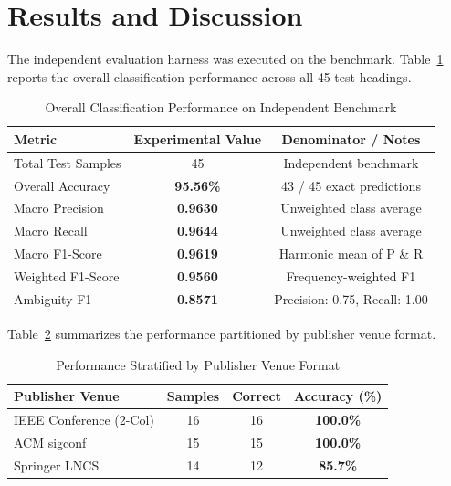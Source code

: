 \documentclass[conference]{IEEEtran}
\begin{document}
\section{Results and Discussion}
The independent evaluation harness was executed on the benchmark. Table~\ref{tab:overall} reports the overall classification performance across all 45 test headings.

\begin{table}[htbp]
\caption{Overall Classification Performance on Independent Benchmark}
\begin{center}
\begin{tabular}{lcc}
\toprule
\textbf{Metric} & \textbf{Experimental Value} & \textbf{Denominator / Notes} \\
\midrule
Total Test Samples & 45 & Independent benchmark \\
Overall Accuracy & \textbf{95.56\%} & 43 / 45 exact predictions \\
Macro Precision & \textbf{0.9630} & Unweighted class average \\
Macro Recall & \textbf{0.9644} & Unweighted class average \\
Macro F1-Score & \textbf{0.9619} & Harmonic mean of P \& R \\
Weighted F1-Score & \textbf{0.9560} & Frequency-weighted F1 \\
Ambiguity F1 & \textbf{0.8571} & Precision: 0.75, Recall: 1.00 \\
\bottomrule
\end{tabular}
\label{tab:overall}
\end{center}
\end{table}

Table~\ref{tab:venue} summarizes the performance partitioned by publisher venue format.

\begin{table}[htbp]
\caption{Performance Stratified by Publisher Venue Format}
\begin{center}
\begin{tabular}{lccc}
\toprule
\textbf{Publisher Venue} & \textbf{Samples} & \textbf{Correct} & \textbf{Accuracy (\%)} \\
\midrule
IEEE Conference (2-Col) & 16 & 16 & \textbf{100.0\%} \\
ACM sigconf & 15 & 15 & \textbf{100.0\%} \\
Springer LNCS & 14 & 12 & \textbf{85.7\%} \\
\bottomrule
\end{tabular}
\label{tab:venue}
\end{center}
\end{table}
\end{document}
